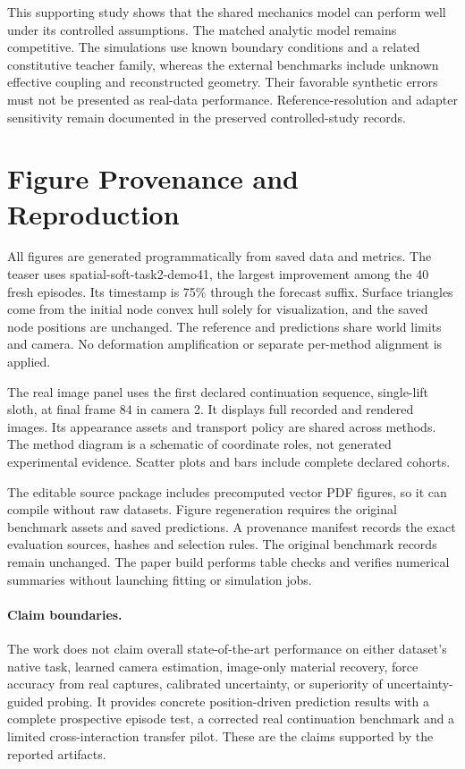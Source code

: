\documentclass[10pt,twocolumn,letterpaper]{article}
\begin{document}
This supporting study shows that the shared mechanics model can perform well under its controlled assumptions. The matched analytic model remains competitive. The simulations use known boundary conditions and a related constitutive teacher family, whereas the external benchmarks include unknown effective coupling and reconstructed geometry. Their favorable synthetic errors must not be presented as real-data performance. Reference-resolution and adapter sensitivity remain documented in the preserved controlled-study records.

\section{Figure Provenance and Reproduction}
All figures are generated programmatically from saved data and metrics. The teaser uses spatial-soft-task2-demo41, the largest improvement among the 40 fresh episodes. Its timestamp is 75\% through the forecast suffix. Surface triangles come from the initial node convex hull solely for visualization, and the saved node positions are unchanged. The reference and predictions share world limits and camera. No deformation amplification or separate per-method alignment is applied.

The real image panel uses the first declared continuation sequence, single-lift sloth, at final frame 84 in camera 2. It displays full recorded and rendered images. Its appearance assets and transport policy are shared across methods. The method diagram is a schematic of coordinate roles, not generated experimental evidence. Scatter plots and bars include complete declared cohorts.

The editable source package includes precomputed vector PDF figures, so it can compile without raw datasets. Figure regeneration requires the original benchmark assets and saved predictions. A provenance manifest records the exact evaluation sources, hashes and selection rules. The original benchmark records remain unchanged. The paper build performs table checks and verifies numerical summaries without launching fitting or simulation jobs.

\paragraph{Claim boundaries.}
The work does not claim overall state-of-the-art performance on either dataset's native task, learned camera estimation, image-only material recovery, force accuracy from real captures, calibrated uncertainty, or superiority of uncertainty-guided probing. It provides concrete position-driven prediction results with a complete prospective episode test, a corrected real continuation benchmark and a limited cross-interaction transfer pilot. These are the claims supported by the reported artifacts.
\end{document}
